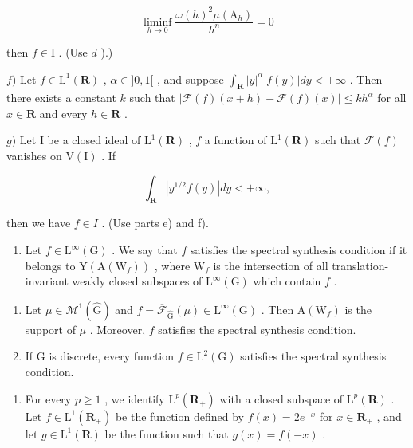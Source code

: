 \[
\liminf _ {h \to 0} \frac {\omega (h) ^ {2} \mu (\mathrm{A} _ {h})}{h ^ {n}} = 0
\]

then \(f\in \mathrm{I}\) . (Use \(d\) ).)

\(f)\) Let \(f \in \mathrm{L}^{1}(\mathbf{R})\) , \(\alpha \in]0,1[\) , and suppose \(\int_{\mathbf{R}} |y|^{\alpha}| f(y)| dy < +\infty\) . Then there exists a constant \(k\) such that \(|\mathcal{F}(f)(x+h)-\mathcal{F}(f)(x)| \leqslant kh^{\alpha}\) for all \(x \in \mathbf{R}\) and every \(h \in \mathbf{R}\) .

\(g)\) Let I be a closed ideal of \(\mathrm{L}^1 (\mathbf{R})\) , \(f\) a function of \(\mathrm{L}^1 (\mathbf{R})\) such that \(\mathcal{F}(f)\) vanishes on \(\mathrm{V(I)}\) . If

\[
\int_ {\mathbf {R}} | y ^ {1 / 2} f (y) | d y <   + \infty ,
\]

then we have \(f \in I\) . (Use parts e) and f).

\begin{enumerate}
\def\labelenumi{\arabic{enumi})}
\setcounter{enumi}{15}
\tightlist
\item
  Let \(f \in \mathrm{L}^{\infty}(\mathrm{G})\) . We say that \(f\) satisfies the spectral synthesis condition if it belongs to \(\mathrm{Y}(\mathrm{A}(\mathrm{W}_f))\) , where \(\mathrm{W}_f\) is the intersection of all translation-invariant weakly closed subspaces of \(\mathrm{L}^{\infty}(\mathrm{G})\) which contain \(f\) .
\end{enumerate}

\begin{enumerate}
\def\labelenumi{\alph{enumi})}
\item
  Let \(\mu \in \mathcal{M}^1 (\widehat{\mathrm{G}})\) and \(f = \overline{\mathcal{F}}_{\widehat{\mathrm{G}}}(\mu)\in \mathrm{L}^{\infty}(\mathrm{G})\) . Then \(\mathrm{A}(\mathrm{W}_f)\) is the support of \(\mu\) . Moreover, \(f\) satisfies the spectral synthesis condition.
\item
  If G is discrete, every function \(f \in \mathrm{L}^{2}(\mathrm{G})\) satisfies the spectral synthesis condition.
\end{enumerate}

\begin{enumerate}
\def\labelenumi{\arabic{enumi})}
\setcounter{enumi}{16}
\tightlist
\item
  For every \(p \geqslant 1\) , we identify \(\mathrm{L}^p(\mathbf{R}_+)\) with a closed subspace of \(\mathrm{L}^p(\mathbf{R})\) . Let \(f \in \mathrm{L}^1(\mathbf{R}_+)\) be the function defined by \(f(x) = 2e^{-x}\) for \(x \in \mathbf{R}_+\) , and let \(g \in \mathrm{L}^1(\mathbf{R})\) be the function such that \(g(x) = f(-x)\) .
\end{enumerate}

